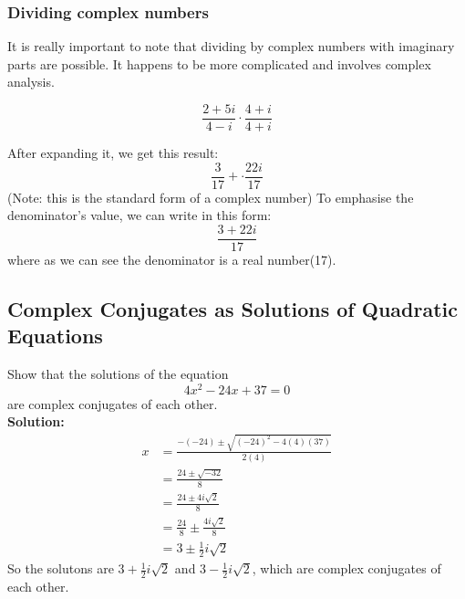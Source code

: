 \subsubsection{Dividing complex numbers}

It is really important to note that dividing by complex numbers with imaginary parts are possible. 
It happens to be more complicated and involves complex analysis. 

$$\frac{2 + 5i}{4 - i}\cdot \frac{4 + i}{4 + i}$$

After expanding it, we get this result: 
$$\frac{3}{17} + \cdot \frac{22i}{17}$$ 
(Note: this is the standard form of a complex number)
To emphasise the denominator's value, we can write in this form:
$$\frac{3+22i}{17}$$
where as we can see the denominator is a real number(17).

\subsection{Complex Conjugates as Solutions of Quadratic Equations}

Show that the solutions of the equation $$4x^2-24x+37=0$$ are complex conjugates of each other. \\
\newline
\textbf{Solution:} \\
\begin{align*}
    x & =\frac{-(-24)\pm\sqrt{(-24)^2-4(4)(37)}}{2(4)} \\
      & =\frac{24\pm\sqrt{-32}}{8}                      \\
      & =\frac{24\pm4i\sqrt{2}}{8}                      \\
      & =\frac{24}{8}\pm\frac{4i\sqrt{2}}{8}            \\
      & =3\pm\frac{1}{2}i\sqrt{2}
\end{align*}
So the solutons are $3+\frac{1}{2}i\sqrt{2}$ and $3-\frac{1}{2}i\sqrt{2}$, which are complex conjugates of each other.